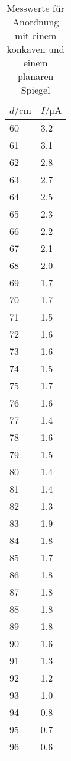 \begin{table}[H]
  \centering
  \caption{Messwerte für Anordnung mit einem konkaven und einem planaren Spiegel}
  \label{tab:tabe2}
    \begin{tabular}{l l}
    \toprule
    $ d / \si{\centi\meter} $ & $ I / \si{\micro\ampere} $ \\
    \midrule
    60 & 3.2  \\
    61 & 3.1  \\
    62 & 2.8  \\
    63 & 2.7  \\
    64 & 2.5  \\
    65 & 2.3  \\
    66 & 2.2  \\
    67 & 2.1  \\
    68 & 2.0  \\
    69 & 1.7  \\
    70 & 1.7  \\
    71 & 1.5  \\
    72 & 1.6  \\
    73 & 1.6  \\
    74 & 1.5  \\
    75 & 1.7  \\
    76 & 1.6  \\
    77 & 1.4  \\
    78 & 1.6  \\
    79 & 1.5  \\
    80 & 1.4  \\
    81 & 1.4  \\
    82 & 1.3  \\
    83 & 1.9  \\
    84 & 1.8  \\
    85 & 1.7  \\
    86 & 1.8  \\
    87 & 1.8  \\
    88 & 1.8  \\
    89 & 1.8  \\
    90 & 1.6  \\
    91 & 1.3  \\
    92 & 1.2  \\
    93 & 1.0  \\
    94 & 0.8  \\
    95 & 0.7  \\
    96 & 0.6  \\


          \bottomrule
        \end{tabular}
    \end{table}
